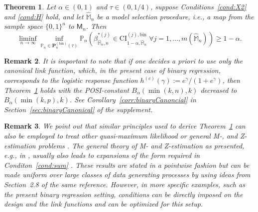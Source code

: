 \documentclass[preprint]{imsart}
\newtheorem{theorem}{Theorem}[section]
\newtheorem{remark}[theorem]{Remark}
\numberwithin{equation}{section}
\begin{document}
\begin{theorem}\label{thm:binary}
Let $\alpha \in (0, 1)$ and $\tau \in(0,1/4)$, suppose Conditions~\ref{cond:X2} %
and \ref{cond:H} %
hold, and let $\hat{\mathbb{M}}_n$ be a model selection procedure, i.e., a map from the sample space $\{0,1\}^n$ to $\mathsf{M}_n$. Then
%
\begin{equation*}
\liminf_{n \to \infty} \inf_{\mathbb{P}_n \in \mathbf{P}_n^{(\mathrm{bin})} 
\left(\tau \right) } \mathbb{P}_n \left(\beta_{\hat{\mathbb{M}}_n, n}^{* (j)} \in \mathrm{CI}_{1-\alpha, \hat{\mathbb{M}}_n}^{(j), \mathrm{bin}} \;\forall j = 1, \hdots, m(\hat{\mathbb{M}}_n)  \right) \geq 1-\alpha.
\end{equation*}
%
\end{theorem}

\begin{remark}\label{rem:canonical:response:function}
It is important to note that if one decides a priori to use only the canonical link function, which, in the present case of binary regression, corresponds to the logistic response function $h^{(c)}(\gamma) := e^\gamma/(1+e^\gamma)$, then Theorem~\ref{thm:binary} holds with the POSI-constant $B_\alpha(\min(k,n),k)$ decreased to $B_\alpha(\min(k,p),k)$. See Corollary~\ref{corr:binaryCanoncial} in Section~\ref{sec:binaryCanonical} of the supplement.
\end{remark}

\begin{remark}
We point out that similar principles used to derive Theorem~\ref{thm:binary} can also be employed to treat other quasi-maximum likelihood or general  M-, and Z-estimation problems \citep[see, e.g.,][for a more general treatment of generalized linear models]{Fahrmeir90}. 
The general theory of M- and Z-estimation as presented, e.g., in \citet[][Sections~3.2 and 3.3]{Vaart96}, usually also leads to expansions of the form required in Conditon~\ref{cond:sum} \citep[cf.][Theorem~3.2.16 and Theorem~3.3.1]{Vaart96}. These results are stated in a pointwise fashion but can be made uniform over large classes of data generating processes by using ideas from Section~2.8 of the same reference.
However, in more specific examples, such as the present binary regression setting, conditions can be directly imposed on the design and the link functions and can be optimized for this setup.
\end{remark}
\end{document}
